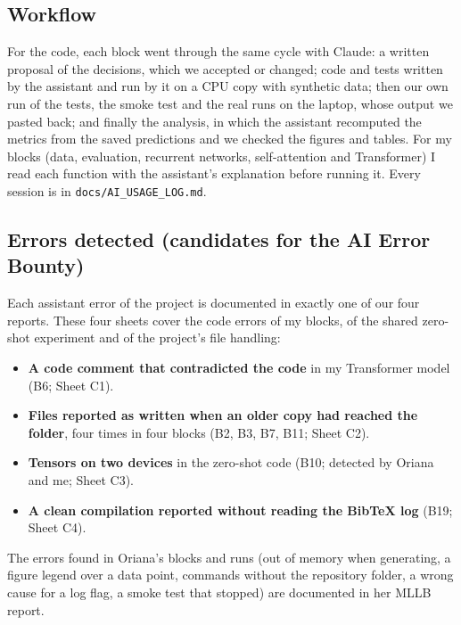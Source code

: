 \label{app:ai-code}

\subsection*{Workflow}

For the code, each block went through the same cycle with Claude: a written proposal of the decisions,
which we accepted or changed; code and tests written by the assistant and run by it on a CPU copy with
synthetic data; then our own run of the tests, the smoke test and the real runs on the laptop, whose output
we pasted back; and finally the analysis, in which the assistant recomputed the metrics from the saved
predictions and we checked the figures and tables. For my blocks (data, evaluation, recurrent networks,
self-attention and Transformer) I read each function with the assistant's explanation before running it.
Every session is in \texttt{docs/AI\_USAGE\_LOG.md}.

\subsection*{Errors detected (candidates for the AI Error Bounty)}

Each assistant error of the project is documented in exactly one of our four reports. These four sheets
cover the code errors of my blocks, of the shared zero-shot experiment and of the project's file handling:
\begin{itemize}[leftmargin=1.2em,itemsep=2pt]
  \item \textbf{A code comment that contradicted the code} in my Transformer model (B6; Sheet C1).
  \item \textbf{Files reported as written when an older copy had reached the folder}, four times in four
        blocks (B2, B3, B7, B11; Sheet C2).
  \item \textbf{Tensors on two devices} in the zero-shot code (B10; detected by Oriana and me; Sheet C3).
  \item \textbf{A clean compilation reported without reading the BibTeX log} (B19; Sheet C4).
\end{itemize}
The errors found in Oriana's blocks and runs (out of memory when generating, a figure legend over a data
point, commands without the repository folder, a wrong cause for a log flag, a smoke test that stopped)
are documented in her MLLB report.

